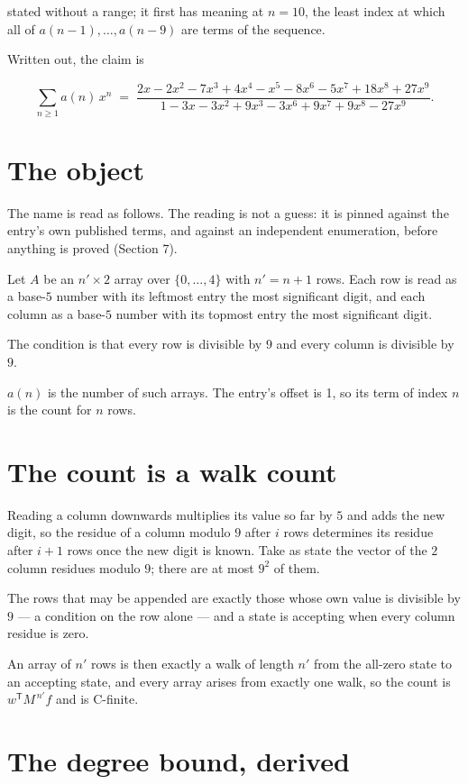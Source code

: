 \documentclass[11pt]{article}
\theoremstyle{definition}
\begin{document}
stated without a range; it first has meaning at $n = 10$, the least index at which all of $a(n-1),\dots,a(n-9)$ are terms of the sequence.

Written out, the claim is

\[\sum_{n \ge 1} a(n)\,x^n \;=\; \frac{2x - 2x^{2} - 7x^{3} + 4x^{4} - x^{5} - 8x^{6} - 5x^{7} + 18x^{8} + 27x^{9}}{1 - 3x - 3x^{2} + 9x^{3} - 3x^{6} + 9x^{7} + 9x^{8} - 27x^{9}}.\]

\section{The object}

The name is read as follows. The reading is not a guess: it is pinned against the entry's own published terms, and against an independent enumeration, before anything is proved (Section 7).

Let $A$ be an $n' \times 2$ array over $\{0,\dots,4\}$ with $n' = n + 1$ rows. Each row is read as a base-$5$ number with its leftmost entry the most significant digit, and each column as a base-$5$ number with its topmost entry the most significant digit.

The condition is that every row is divisible by $9$ and every column is divisible by $9$.

$a(n)$ is the number of such arrays. The entry's offset is 1, so its term of index $n$ is the count for $n$ rows.

\section{The count is a walk count}

Reading a column downwards multiplies its value so far by $5$ and adds the new digit, so the residue of a column modulo $9$ after $i$ rows determines its residue after $i+1$ rows once the new digit is known. Take as state the vector of the $2$ column residues modulo $9$; there are at most $9^{2}$ of them.

The rows that may be appended are exactly those whose own value is divisible by $9$ --- a condition on the row alone --- and a state is accepting when every column residue is zero.

An array of $n'$ rows is then exactly a walk of length $n'$ from the all-zero state to an accepting state, and every array arises from exactly one walk, so the count is $w^{\mathsf T}M^{\,n'}f$ and is C-finite.

\section{The degree bound, derived}
\end{document}
